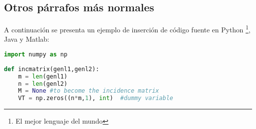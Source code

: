 		\lipsum[115]
		\vspace{\defaultnewlinesize}
		\lipsum[4]
		
	\subsection{Otros párrafos más normales}
	
		\lipsum[7]
		
		\newp \lipsum[2]
		
		
		\begin{multicols}{2}
		
			\lipsum[114]
			
			\vspace{-0.1cm}
			
			\lipsum[5]
			
		\end{multicols}
		
		\lipsum[1]
		
		
\newpage	



	A continuación se presenta un ejemplo de inserción de código fuente en Python \footnote{ El mejor lenguaje del mundo}, Java y Matlab:

\lstset{style=Python}
\begin{lstlisting}[language=Python, caption=Ejemplo en Python]
import numpy as np
 
def incmatrix(genl1,genl2):
    m = len(genl1)
    n = len(genl2)
    M = None #to become the incidence matrix
    VT = np.zeros((n*m,1), int)  #dummy variable
\end{lstlisting}


